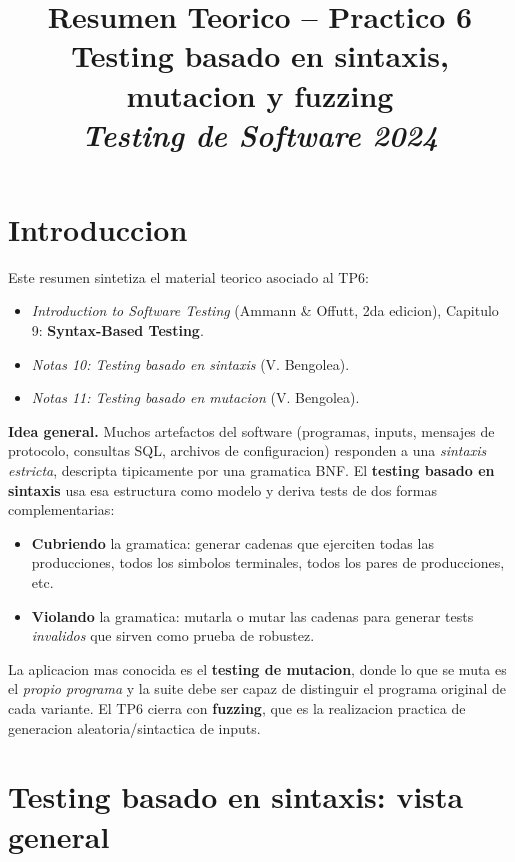 \documentclass[12pt,a4paper]{article}
\title{\textbf{Resumen Teorico -- Practico 6}\\
Testing basado en sintaxis, mutacion y fuzzing\\
\textit{Testing de Software 2024}}
\author{}
\date{}
\begin{document}
\maketitle
\tableofcontents
\newpage

\section*{Introduccion}

Este resumen sintetiza el material teorico asociado al TP6:

\begin{itemize}
  \item \textit{Introduction to Software Testing} (Ammann \& Offutt, 2da edicion), Capitulo 9:
  \textbf{Syntax-Based Testing}.
  \item \textit{Notas 10: Testing basado en sintaxis} (V. Bengolea).
  \item \textit{Notas 11: Testing basado en mutacion} (V. Bengolea).
\end{itemize}

\textbf{Idea general.} Muchos artefactos del software (programas, inputs, mensajes de
protocolo, consultas SQL, archivos de configuracion) responden a una \emph{sintaxis estricta},
descripta tipicamente por una gramatica BNF. El \textbf{testing basado en sintaxis} usa esa
estructura como modelo y deriva tests de dos formas complementarias:

\begin{itemize}
  \item \textbf{Cubriendo} la gramatica: generar cadenas que ejerciten todas las producciones,
  todos los simbolos terminales, todos los pares de producciones, etc.
  \item \textbf{Violando} la gramatica: mutarla o mutar las cadenas para generar tests
  \emph{invalidos} que sirven como prueba de robustez.
\end{itemize}

La aplicacion mas conocida es el \textbf{testing de mutacion}, donde lo que se muta es el
\emph{propio programa} y la suite debe ser capaz de distinguir el programa original de cada
variante. El TP6 cierra con \textbf{fuzzing}, que es la realizacion practica de generacion
aleatoria/sintactica de inputs.

\section{Testing basado en sintaxis: vista general}
\end{document}
